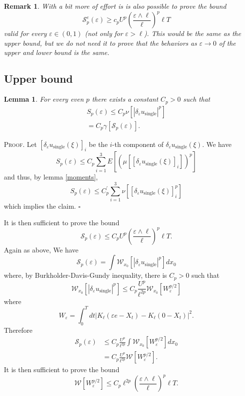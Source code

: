 \documentclass[a4paper,12pt]{article}
\newtheorem{lemma}{Lemma}
\newtheorem{remark}{Remark}
\begin{document}
\begin{remark}
With a bit more of effort is is also possible to prove the bound
\[
\mathcal{S}_{p}^{e}(\varepsilon)\geq c_{p}U^{p}\left(  \frac{\varepsilon
\wedge\ell}{\ell}\right)  ^{p}\ell T
\]
valid for every $\varepsilon\in\left(  0,1\right)  $ (not only for
$\varepsilon>\ell$). This would be the same as the upper bound, but we do not
need it to prove that the behaviors as $\varepsilon\rightarrow0$ of the upper
and lower bound is the same.
\end{remark}

\subsection{Upper bound}

\begin{lemma}
For every even $p$ there exists a constant $C_{p}>0$ such that
\begin{align*}
S_{p}(\varepsilon)\leq C_{p}\nu\left[  \left|  \delta_{\varepsilon
}u_{\text{single}}\right|  ^{p}\right] \\
=C_{p}\gamma\left[  \mathcal{S}_{p}(\varepsilon)\right]  .
\end{align*}
\end{lemma}

\textsc{Proof.}\hspace{0.3cm} Let $\left[  \delta_{\varepsilon}%
u_{\text{single}}\left(  \xi\right)  \right]  _{i}$ be the $i$-th component of
$\delta_{\varepsilon}u_{\text{single}}\left(  \xi\right)  $. We have
\[
S_{p}(\varepsilon)\leq C_{p}\sum_{i=1}^{3}E\left[  \left(  \mu\left[  \left[
\delta_{\varepsilon}u_{\text{single}}\left(  \xi\right)  \right]  _{i}\right]
\right)  ^{p}\right]
\]
and thus, by lemma \ref{moments},
\[
S_{p}(\varepsilon)\leq C_{p}^{\prime}\sum_{i=1}^{3}\nu\left[  \left[
\delta_{\varepsilon}u_{\text{single}}\left(  \xi\right)  \right]  _{i}%
^{p}\right]
\]
which implies the claim. \hfill$\square$

It is then sufficient to prove the bound
\[
\mathcal{S}_{p}(\varepsilon)\leq C_{p}U^{p}\left(  \frac{\varepsilon\wedge
\ell}{\ell}\right)  ^{p}\ell T.
\]
Again as above, We have
\[
\mathcal{S}_{p}(\varepsilon)=\int\mathcal{W}_{x_{0}}\left[  \left|
\delta_{\varepsilon}u_{\text{single}}\right|  ^{p}\right]  dx_{0}%
\]
where, by Burkholder-Davis-Gundy inequality, there is $C_{p}>0$ such that
\[
\mathcal{W}_{x_{0}}\left[  \left|  \delta_{\varepsilon}u_{\text{single}%
}\right|  ^{p}\right]  \leq C_{p}\frac{U^{p}}{\ell^{2p}}\mathcal{W}_{x_{0}%
}\left[  W_{\varepsilon}^{p/2}\right]
\]
where
\[
W_{\varepsilon}=\int_{0}^{T}dt|K_{\ell}(\varepsilon e-X_{t})-K_{\ell}%
(0-X_{t})|^{2}.
\]
Therefore
\begin{align*}
\mathcal{S}_{p}(\varepsilon)  &  \leq C_{p}\frac{U^{p}}{\ell^{2p}}%
\int\mathcal{W}_{x_{0}}\left[  W_{\varepsilon}^{p/2}\right]  dx_{0}\\
&  =C_{p}\frac{U^{p}}{\ell^{2p}}\mathcal{W}\left[  W_{\varepsilon}%
^{p/2}\right]  .
\end{align*}
It is then sufficient to prove the bound
\[
\mathcal{W}\left[  W_{\varepsilon}^{p/2}\right]  \leq C_{p}\ell^{2p}\left(
\frac{\varepsilon\wedge\ell}{\ell}\right)  ^{p}\ell T.
\]
\end{document}
